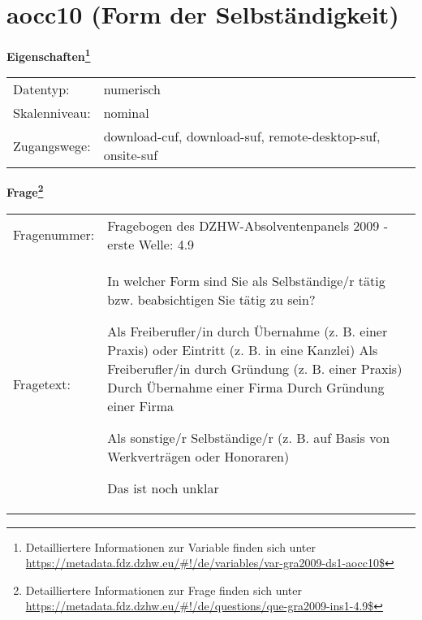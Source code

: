 
    \setcounter{footnote}{0}

    \vspace*{-1.8cm}
	\section{aocc10 (Form der Selbständigkeit)}
	\label{section:aocc10}



    \vspace*{0.5cm}
    \noindent\textbf{Eigenschaften\footnote{Detailliertere Informationen zur Variable finden sich unter
		\url{https://metadata.fdz.dzhw.eu/\#!/de/variables/var-gra2009-ds1-aocc10$}}}\\
	\begin{tabularx}{\hsize}{@{}lX}
	Datentyp: & numerisch \\
	Skalenniveau: & nominal \\
	Zugangswege: &
	  download-cuf, 
	  download-suf, 
	  remote-desktop-suf, 
	  onsite-suf
 \\
    \end{tabularx}



				\vspace*{0.5cm}
                \noindent\textbf{Frage\footnote{Detailliertere Informationen zur Frage finden sich unter
		              \url{https://metadata.fdz.dzhw.eu/\#!/de/questions/que-gra2009-ins1-4.9$}}}\\
				\begin{tabularx}{\hsize}{@{}lX}
					Fragenummer: &
					  Fragebogen des DZHW-Absolventenpanels 2009 - erste Welle:
					  4.9
 \\
					Fragetext: & In welcher Form sind Sie als Selbständige/r tätig bzw. beabsichtigen Sie tätig zu sein?\par  Als Freiberufler/in durch Übernahme (z. B. einer Praxis) oder Eintritt (z. B. in eine Kanzlei) Als Freiberufler/in durch Gründung (z. B. einer Praxis) Durch Übernahme einer Firma Durch Gründung einer Firma\par  Als sonstige/r Selbständige/r (z. B. auf Basis von Werkverträgen oder Honoraren)\par  Das ist noch unklar \\
				\end{tabularx}





